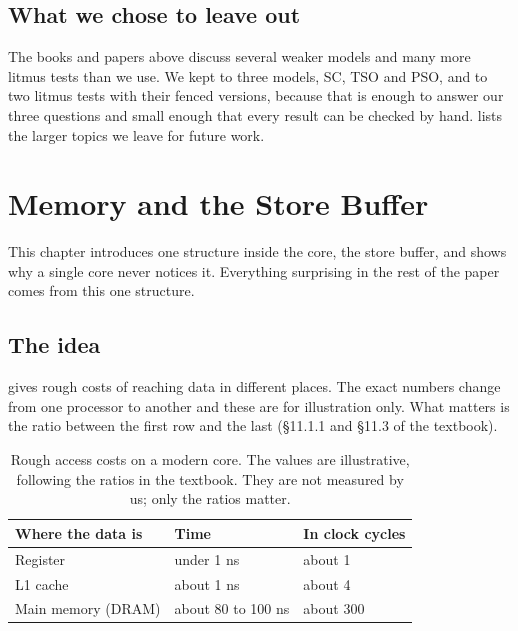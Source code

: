 \section{What we chose to leave out}

The books and papers above discuss several weaker models and many more litmus tests than we use. We kept to three models, SC, TSO and PSO, and to two litmus tests with their fenced versions, because that is enough to answer our three questions and small enough that every result can be checked by hand.  lists the larger topics we leave for future work.

\chapter{Memory and the Store Buffer}
\label{ch:storebuf}

This chapter introduces one structure inside the core, the store buffer, and shows why a single core never notices it. Everything surprising in the rest of the paper comes from this one structure.

\section{The idea}
\label{sec:sbidea}

 gives rough costs of reaching data in different places. The exact numbers change from one processor to another and these are for illustration only. What matters is the ratio between the first row and the last (\S11.1.1 and \S11.3 of the textbook\cite{sarangiBasic}).

\begin{table}[!htbp]
\centering\small
\caption{Rough access costs on a modern core. The values are illustrative, following the ratios in the textbook\cite{sarangiBasic}. They are not measured by us; only the ratios matter.}
\label{tab:latency}
\begin{tabular}{@{}lll@{}}
\toprule
Where the data is & Time & In clock cycles\\
\midrule
Register & under 1 ns & about 1\\
L1 cache & about 1 ns & about 4\\
Main memory (DRAM) & about 80 to 100 ns & about 300\\
\bottomrule
\end{tabular}
\end{table}


